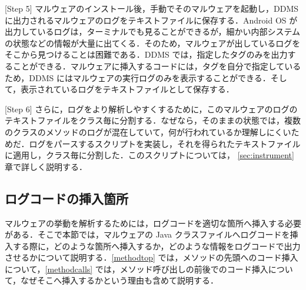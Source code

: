 [Step 5] マルウェアのインストール後，手動でそのマルウェアを起動し，DDMS に出力されるマルウェアのログをテキストファイルに保存する．Android OS が出力しているログは，ターミナルでも見ることができるが，細かい内部システムの状態などの情報が大量に出てくる．そのため，マルウェアが出しているログをそこから見つけることは困難である．DDMS では，指定したタグのみを出力することができる．マルウェアに挿入するコードには，タグを自分で指定しているため，DDMS にはマルウェアの実行ログのみを表示することができる．そして，表示されているログをテキストファイルとして保存する．

[Step 6] さらに，ログをより解析しやすくするために，このマルウェアのログのテキストファイルをクラス毎に分割する．なぜなら，そのままの状態では，複数のクラスのメソッドのログが混在していて，何が行われているか理解しにくいためだ．ログをパースするスクリプトを実装し，それを得られたテキストファイルに適用し，クラス毎に分割した．このスクリプトについては， \ref{sec:instrument} 章で詳しく説明する．

\subsection{ログコードの挿入箇所}
\label{placeinsert}
マルウェアの挙動を解析するためには，ログコードを適切な箇所へ挿入する必要がある．そこで本節では，マルウェアの Java クラスファイルへログコードを挿入する際に，どのような箇所へ挿入するか，どのような情報をログコードで出力させるかについて説明する．\ref{methodtop} では，メソッドの先頭へのコード挿入について，\ref{methodcalls} では，メソッド呼び出しの前後でのコード挿入について，なぜそこへ挿入するかという理由も含めて説明する．

